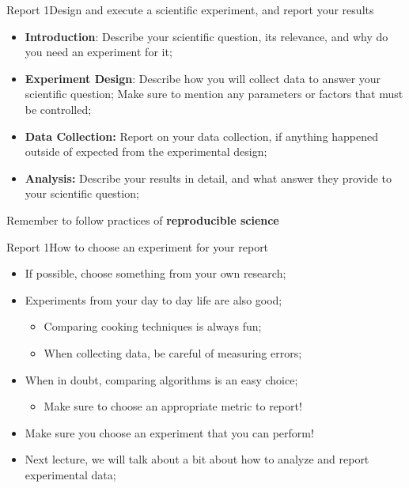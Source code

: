 \documentclass[aspectratio=169]{beamer}
\begin{document}
\begin{CJK}{UTF8}{ipxm}
\begin{frame}{Report 1}{Design and execute a scientific experiment, and report your results}
  \begin{itemize}
    \item {\bf Introduction}: Describe your scientific question, its relevance, and why do you need an experiment for it;
    \item {\bf Experiment Design}: Describe how you will collect data to answer your scientific question; Make sure to mention any parameters or factors that must be controlled;
    \item {\bf Data Collection:} Report on your data collection, if anything happened outside of expected from the experimental design;
    \item {\bf Analysis:} Describe your results in detail, and what answer they provide to your scientific question;
  \end{itemize}
  \begin{alertblock}{}
    \alert{Remember to follow practices of {\bf reproducible science}}
  \end{alertblock}
\end{frame}

\begin{frame}{Report 1}{How to choose an experiment for your report}
  \begin{itemize}
    \item If possible, choose something from your own research;
    \medskip

    \item Experiments from your day to day life are also good;
    \begin{itemize}
      \item Comparing cooking techniques is always fun;
      \item When collecting data, be careful of measuring errors;
    \end{itemize}
    \medskip

    \item When in doubt, comparing algorithms is an easy choice;
    \begin{itemize}
      \item Make sure to choose an appropriate metric to report!
    \end{itemize}
    \medskip

    \item Make sure you choose an experiment that you can perform!
    \bigskip

    \item Next lecture, we will talk about a bit about how to analyze and report experimental data;
  \end{itemize}
\end{frame}


\end{CJK}
\end{document}
